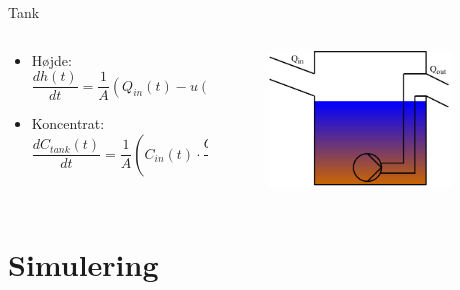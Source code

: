 \begin{frame}{Tank}{}
\vfill\vfill\centering
	\begin{columns}
	\begin{column}{0.75\textwidth}
		\begin{itemize}
			\vspace{7mm}
			\item<1-> Højde: \\ 
			\vspace{5mm}	
			$\dfrac{dh(t)}{dt}=\dfrac{1}{A} \left(Q_{in}(t)-u(t) \cdot \overline Q \right)$
			\vspace{7mm}
			\item<2-> Koncentrat: \\ 
			\vspace{7mm}
			$\dfrac{dC_{tank}(t)}{dt} = \dfrac{1}{A} \left(C_{in}(t) \cdot \dfrac{Q_{in}(t)}{h(t)} - C_{tank}(t) \cdot \dfrac{Q_{out}(t)}{h(t)} \right)$
		\end{itemize}
	\end{column}

	\begin{column}{0.3\textwidth}
		\begin{figure}[H]
			\centering
			\includegraphics[width=0.9\textwidth]{Sections/pictures/reservior_with_pump.pdf}
		\end{figure}
	\end{column}
\end{columns}
\vfill\vfill		
\end{frame}
	
\section{Simulering}
